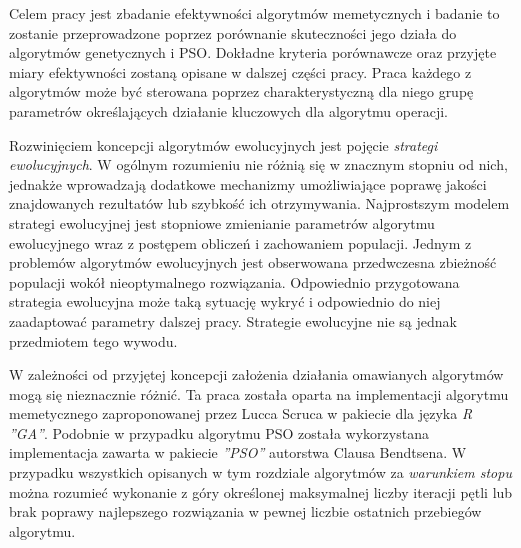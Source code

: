 \par
Celem pracy jest zbadanie efektywności algorytmów memetycznych i badanie to zostanie przeprowadzone poprzez porównanie skuteczności jego działa do algorytmów genetycznych i PSO. Dokładne kryteria porównawcze oraz przyjęte miary efektywności zostaną opisane w dalszej części pracy. Praca każdego z algorytmów może być sterowana poprzez charakterystyczną dla niego grupę parametrów określających działanie kluczowych dla algorytmu operacji. 
\par 
Rozwinięciem koncepcji algorytmów ewolucyjnych jest pojęcie \emph{strategi ewolucyjnych}. W ogólnym rozumieniu nie różnią się w znacznym stopniu od nich, jednakże wprowadzają dodatkowe mechanizmy umożliwiające poprawę jakości znajdowanych rezultatów lub szybkość ich otrzymywania. Najprostszym modelem strategi ewolucyjnej jest stopniowe zmienianie parametrów algorytmu ewolucyjnego wraz z postępem obliczeń i zachowaniem populacji. Jednym z problemów algorytmów ewolucyjnych jest obserwowana przedwczesna zbieżność populacji wokół nieoptymalnego rozwiązania. Odpowiednio przygotowana strategia ewolucyjna może taką sytuację wykryć i odpowiednio do niej zaadaptować parametry dalszej pracy. Strategie ewolucyjne nie są jednak przedmiotem tego wywodu.
\par
W zależności od przyjętej koncepcji założenia działania omawianych algorytmów mogą się nieznacznie różnić. Ta praca została oparta na implementacji algorytmu memetycznego zaproponowanej przez Lucca Scruca w pakiecie dla języka \emph{R ''GA''}\cite{gaPackage}. Podobnie w przypadku algorytmu PSO została wykorzystana implementacja zawarta w pakiecie \emph{''PSO''} autorstwa Clausa Bendtsena\cite{psoPackage}. W przypadku wszystkich opisanych w tym rozdziale algorytmów za \emph{warunkiem stopu} można rozumieć wykonanie z góry określonej maksymalnej liczby iteracji pętli lub brak poprawy najlepszego rozwiązania w pewnej liczbie ostatnich przebiegów algorytmu. 

